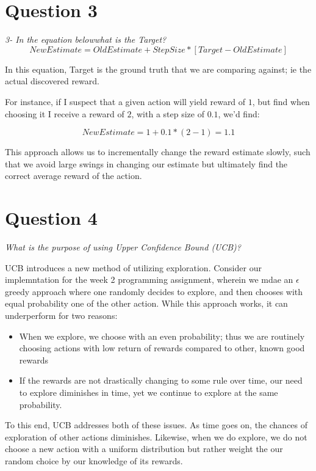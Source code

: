 \documentclass{article}
\begin{document}
\section*{Question 3}
\textit{    3- In the equation belowwhat is the Target?}
\begin{equation}
    NewEstimate = OldEstimate + StepSize * [Target-OldEstimate]
\end{equation}

In this equation, Target is the ground truth that we are comparing against; ie the actual discovered reward.

For instance, if I suspect that a given action will yield reward of $1$, but find when choosing it I receive a reward of $2$, with a step size of $0.1$, we'd find:

\begin{equation}
    NewEstimate = 1 + 0.1*(2-1) = 1.1
\end{equation}

This approach allows us to incrementally change the reward estimate slowly, such that we avoid large swings in changing our estimate but ultimately find the correct average reward of the action.

\section*{Question 4}

\textit{What is the purpose of using Upper Confidence Bound (UCB)?}

UCB introduces a new method of utilizing exploration. Consider our implemntation for the week 2 programming assignment, wherein we mdae an $\epsilon$ greedy approach where one randomly decides to explore, and then chooses with equal probability one of the other action. While this approach works, it can underperform for two reasons:

\begin{itemize}
    \item When we explore, we choose with an even probability; thus we are routinely choosing actions with low return of rewards compared to other, known good rewards
    \item If the rewards are not drastically changing to some rule over time, our need to explore diminishes in time, yet we continue to explore at the same probability.
\end{itemize}

To this end, UCB addresses both of these issues. As time goes on, the chances of exploration of other actions diminishes. Likewise, when we do explore, we do not choose a new action with a uniform distribution but rather weight the our random choice by our knowledge of its rewards.
\end{document}
